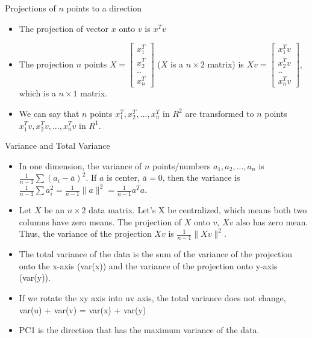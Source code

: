 \documentclass[
  ignorenonframetext,
]{beamer}
\begin{document}
\begin{frame}{Projections of \(n\) points to a direction}
\protect\hypertarget{projections-of-n-points-to-a-direction}{}
\begin{itemize}
\item
  The projection of vector \(x\) onto \(v\) is \(x^Tv\)
\item
  The projection \(n\) points
  \(X = \begin{bmatrix} x_1^T \\ x_2^T\\..\\x_n^T \end{bmatrix}\) (\(X\)
  is a \(n \times 2\) matrix) is
  \(Xv=\begin{bmatrix} x_1^Tv \\ x_2^Tv\\..\\x_n^Tv \end{bmatrix}\),
  which is a \(n \times 1\) matrix.
\item
  We can say that \(n\) points \(x_1^T, x_2^T,..., x_n^T\) in \(R^2\)
  are transformed to \(n\) points \(x_1^Tv, x_2^Tv,..., x_n^Tv\) in
  \(R^1\).
\end{itemize}
\end{frame}

\begin{frame}{Variance and Total Variance}
\protect\hypertarget{variance-and-total-variance}{}
\begin{itemize}
\item
  In one dimension, the variance of \(n\) points/numbers
  \(a_1, a_2,..., a_n\) is \(\frac{1}{n-1} \sum (a_i - \bar{a})^2\). If
  \(a\) is center, \(\bar{a}=0\), then the variance is
  \(\frac{1}{n-1} \sum a_i^2 = \frac{1}{n-1} \|a\|^2 = \frac{1}{n-1}a^Ta\).
\item
  Let \(X\) be an \(n \times 2\) data matrix. Let's X be centralized,
  which means both two columns have zero means. The projection of \(X\)
  onto \(v\), \(Xv\) also has zero mean. Thus, the variance of the
  projection \(Xv\) is \(\frac{1}{n-1} \|Xv\|^2\).
\item
  The total variance of the data is the sum of the variance of the
  projection onto the x-axis (var(x)) and the variance of the projection
  onto y-axis (var(y)).
\item
  If we rotate the xy axis into uv axis, the total variance does not
  change, var(u) + var(v) = var(x) + var(y)
\item
  PC1 is the direction that has the maximum variance of the data.
\end{itemize}
\end{frame}
\end{document}
